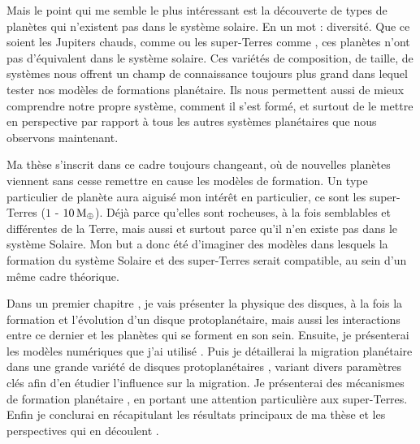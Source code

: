 Mais le point qui me semble le plus intéressant est la découverte de types de planètes qui n'existent pas dans le système solaire. En un mot : diversité. Que ce soient les Jupiters chauds, comme  ou les super-Terres comme , ces planètes n'ont pas d'équivalent dans le système solaire. Ces variétés de composition, de taille, de systèmes nous offrent un champ de connaissance toujours plus grand dans lequel tester nos modèles de formations planétaire. Ils nous permettent aussi de mieux comprendre notre propre système, comment il s'est formé, et surtout de le mettre en perspective par rapport à tous les autres systèmes planétaires que nous observons maintenant.

Ma thèse s'inscrit dans ce cadre toujours changeant, où de nouvelles planètes viennent sans cesse remettre en cause les modèles de formation. Un type particulier de planète aura aiguisé mon intérêt en particulier, ce sont les super-Terres ($1$ - $10\mathrm{\thinspace M_\oplus}$). Déjà parce qu'elles sont rocheuses, à la fois semblables et différentes de la Terre, mais aussi et surtout parce qu'il n'en existe pas dans le système Solaire. Mon but a donc été d'imaginer des modèles dans lesquels la formation du système Solaire et des super-Terres serait compatible, au sein d'un même cadre théorique.

Dans un premier chapitre , je vais présenter la physique des disques, à la fois la formation et l'évolution d'un disque protoplanétaire, mais aussi les interactions entre ce dernier et les planètes qui se forment en son sein. Ensuite, je présenterai les modèles numériques que j'ai utilisé . Puis je détaillerai la migration planétaire dans une grande variété de disques protoplanétaires , variant divers paramètres clés afin d'en étudier l'influence sur la migration. Je présenterai des mécanismes de formation planétaire , en portant une attention particulière aux super-Terres. Enfin je conclurai en récapitulant les résultats principaux de ma thèse et les perspectives qui en découlent .

